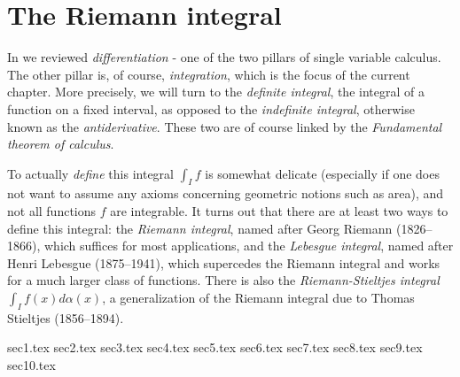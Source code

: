 \chapter{The Riemann integral}\label{i:ch:11}

\begin{note}
  In  we reviewed \emph{differentiation} - one of the two pillars of single variable calculus.
  The other pillar is, of course, \emph{integration}, which is the focus of the current chapter.
  More precisely, we will turn to the \emph{definite integral}, the integral of a function on a fixed interval, as opposed to the \emph{indefinite integral}, otherwise known as the \emph{antiderivative}.
  These two are of course linked by the \emph{Fundamental theorem of calculus}.
\end{note}

\begin{note}
  To actually \emph{define} this integral \(\int_I f\) is somewhat delicate (especially if one does not want to assume any axioms concerning geometric notions such as area), and not all functions \(f\) are integrable.
  It turns out that there are at least two ways to define this integral:
  the \emph{Riemann integral}, named after Georg Riemann (1826--1866), which suffices for most applications, and the \emph{Lebesgue integral}, named after Henri Lebesgue (1875--1941), which supercedes the Riemann integral and works for a much larger class of functions.
  There is also the \emph{Riemann-Stieltjes integral} \(\int_I f(x) d \alpha(x)\), a generalization of the Riemann integral due to Thomas Stieltjes (1856--1894).
\end{note}

{sec1.tex}
{sec2.tex}
{sec3.tex}
{sec4.tex}
{sec5.tex}
{sec6.tex}
{sec7.tex}
{sec8.tex}
{sec9.tex}
{sec10.tex}
